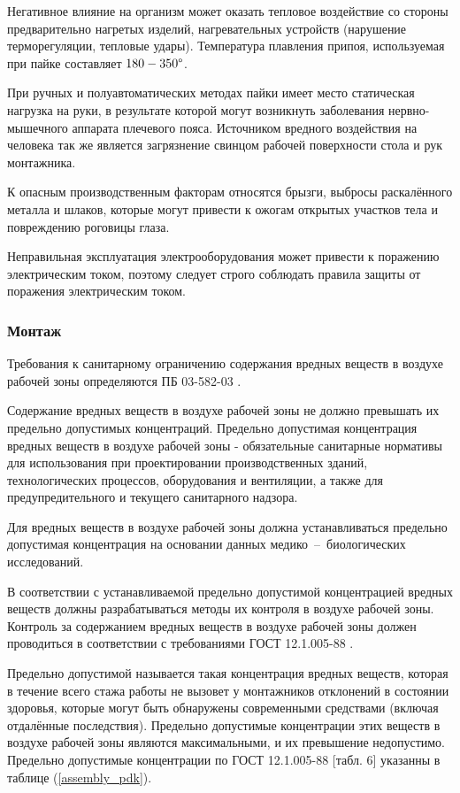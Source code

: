 Негативное влияние на организм может оказать тепловое воздействие со стороны
предварительно нагретых изделий, нагревательных устройств (нарушение терморегуляции,
тепловые удары). Температура плавления припоя, используемая при пайке составляет
$180 - 350 \degree$.

При ручных и полуавтоматических методах пайки имеет место статическая нагрузка на
руки, в результате которой могут возникнуть заболевания нервно-мышечного аппарата
плечевого пояса. Источником вредного воздействия на человека так же является
загрязнение свинцом рабочей поверхности стола и рук монтажника.

К опасным производственным факторам относятся брызги, выбросы раскалённого
металла и шлаков, которые могут привести к ожогам открытых участков тела и
повреждению роговицы глаза.

Неправильная эксплуатация электрооборудования может привести к поражению
электрическим током, поэтому следует строго соблюдать правила защиты от поражения
электрическим током.

\subsubsection{Монтаж}

Требования к санитарному ограничению содержания вредных веществ в воздухе рабочей
зоны определяются ПБ 03-582-03 \cite{ecology_pb_03_582_03}.

Содержание вредных веществ в воздухе рабочей зоны не должно превышать их
предельно допустимых концентраций. Предельно допустимая концентрация вредных
веществ в воздухе рабочей зоны - обязательные санитарные нормативы для
использования при проектировании производственных зданий, технологических
процессов, оборудования и вентиляции, а также для предупредительного и
текущего санитарного надзора.

Для вредных веществ в воздухе рабочей зоны должна устанавливаться предельно
допустимая концентрация на основании данных медико~--~биологических исследований.

В соответствии с устанавливаемой предельно допустимой концентрацией вредных
веществ должны разрабатываться методы их контроля в воздухе рабочей зоны.
Контроль за содержанием вредных веществ в воздухе рабочей зоны должен проводиться
в соответствии с требованиями ГОСТ 12.1.005-88 \cite{ecology_gost_005_88}.

Предельно допустимой называется такая концентрация вредных веществ, которая в
течение всего стажа работы не вызовет у монтажников отклонений в состоянии
здоровья, которые могут быть обнаружены современными средствами (включая
отдалённые последствия). Предельно допустимые концентрации этих веществ в воздухе
рабочей зоны являются максимальными, и их превышение недопустимо. Предельно
допустимые концентрации по ГОСТ 12.1.005-88 \cite{ecology_gost_005_88}[табл. 6]
указанны в таблице (\ref{assembly_pdk}).

